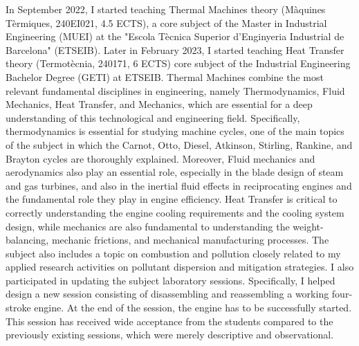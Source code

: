 \documentclass{article}
\begin{document}
In September 2022, I started teaching Thermal Machines theory (Màquines Tèrmiques, 240EI021, 4.5 ECTS), a core subject of the Master in Industrial Engineering (MUEI) at the "Escola Tècnica Superior d'Enginyeria Industrial de Barcelona" (ETSEIB). Later in February 2023, I started teaching Heat Transfer theory (Termotècnia, 240171, 6 ECTS) core subject of the Industrial Engineering Bachelor Degree (GETI) at ETSEIB. Thermal Machines combine the most relevant fundamental disciplines in engineering, namely Thermodynamics, Fluid Mechanics, Heat Transfer, and Mechanics, which are essential for a deep understanding of this technological and engineering field. Specifically, thermodynamics is essential for studying machine cycles, one of the main topics of the subject in which the Carnot, Otto, Diesel, Atkinson, Stirling, Rankine, and Brayton cycles are thoroughly explained. Moreover, Fluid mechanics and aerodynamics also play an essential role, especially in the blade design of steam and gas turbines, and also in the inertial fluid effects in reciprocating engines and the fundamental role they play in engine efficiency. Heat Transfer is critical to correctly understanding the engine cooling requirements and the cooling system design, while mechanics are also fundamental to understanding the weight-balancing, mechanic frictions, and mechanical manufacturing processes. The subject also includes a topic on combustion and pollution closely related to my applied research activities on pollutant dispersion and mitigation strategies. 
I also participated in updating the subject laboratory sessions. Specifically, I helped design a new session consisting of disassembling and reassembling a working four-stroke engine. At the end of the session, the engine has to be successfully started. This session has received wide acceptance from the students compared to the previously existing sessions, which were merely descriptive and observational.  
\end{document}
